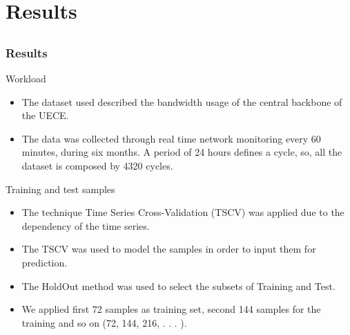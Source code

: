 \documentclass[aspectratio=169]{beamer}
\begin{document}



\section{Results}


\subsection{}
\begin{frame}
\frametitle{Results}
\small
\begin{block}{Workload}
\begin{itemize} \small
    \item The dataset used described the bandwidth usage of the central backbone of the UECE.
    \item The data was collected through real time network monitoring every 60 minutes, during six months. A period of 24 hours defines a cycle, so, all the dataset is composed by 4320 cycles.
\end{itemize}
\end{block}

\begin{block}{Training and test samples}
\begin{itemize} \small
    \item The technique Time Series Cross-Validation (TSCV) was applied due to the dependency of the time series.
    \item The TSCV was used to model the samples in order to input them for prediction.
    \item The HoldOut method was used to select the subsets of Training and Test.
    \item We applied first 72 samples as training set, second 144 samples for the training and so on (72, 144, 216, . . . ).
\end{itemize}
\end{block}
\end{frame}

\end{document}
